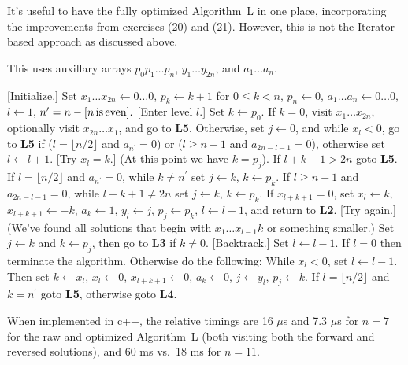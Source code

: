 
\noindent It's useful to have the fully optimized Algorithm~L in one place, 
incorporating the improvements from exercises (20) and (21).   However, this
is not the Iterator based approach as discussed above.

\noindent This uses auxillary arrays $p_0 p_1 \ldots p_n$, $y_1 \ldots y_{2n}$, 
and $a_1 \ldots a_n$.

 [Initialize.] Set $x_1 \ldots x_{2 n} \leftarrow 0 
\ldots 0$, $p_k \leftarrow k + 1$ for $0 \leq k < n$, $p_n \leftarrow 0$, 
$a_{1} \ldots a_{n} \leftarrow 0 \ldots 0$, $l \leftarrow 1$,
$n^{\prime} = n - [n \rm{\, is\, even}].$
\vskip 0.05in
 [Enter level $l$.] Set $k \gets p_0$.  If $k = 0$, visit
$x_1 \ldots x_{2n}$, optionally visit $x_{2n} \ldots x_1$, and 
go to {\bf L5}.  Otherwise, set $j \leftarrow 0$, and
while $x_l < 0$, go to {\bf L5} if ($l = \lfloor n / 2 \rfloor$ and 
$a_{n^{\prime}} = 0$) or ($l \ge n - 1$ and $a_{2n - l - 1} = 0$), otherwise
set $l \leftarrow l + 1$.
\vskip 0.05in
 [Try $x_l = k$.] (At this point we have $k = p_j$).  
If $l + k + 1 > 2n$ goto {\bf L5}.  If $l = \lfloor n / 2 \rfloor$ and 
$a_{n^{\prime}} = 0$, while $k \ne n^{\prime}$ set $j \leftarrow k$, 
$k \leftarrow p_k$.  If $l \ge n - 1$ and $a_{2n - l - 1} = 0$, while 
$l + k + 1 \ne 2 n $ set $j \leftarrow k$, $k \leftarrow p_k$.  If 
$x_{l + k + 1} = 0$, set $x_l \leftarrow k$, $x_{l + k + 1} \leftarrow - k$,
$a_k \leftarrow 1$, $y_l \leftarrow j$, $p_j \leftarrow p_k$, 
$l \leftarrow l + 1$, and return to {\bf L2}.
\vskip 0.05in
 [Try again.] (We've found all solutions that begin with 
$x_1 \ldots x_{l-1} k$ or something smaller.) Set $j \leftarrow k$ and 
$k \leftarrow p_j$, then go to {\bf L3} if $k \ne 0$.
\vskip 0.05in
 [Backtrack.] Set $l \leftarrow l - 1$.   If $l = 0$ then 
terminate the algorithm. Otherwise do the following: While $x_l < 0$, set 
$l \leftarrow l - 1$.  Then set $k \leftarrow x_l$, $x_l \leftarrow 0$, 
$x_{l + k + 1} \leftarrow 0$, $a_k \leftarrow 0$, $j \leftarrow y_l$, 
$p_j \leftarrow k$.  If $l = \lfloor n / 2 \rfloor$ and $k = n^{\prime}$
goto {\bf L5}, otherwise goto {\bf L4}.
\vskip 0.1in

\noindent When implemented in c++, the relative timings are 16 $\mu$s and 7.3 $\mu$s 
for $n = 7$ for the raw and optimized Algorithm~L (both visiting both the 
forward and reversed solutions), and 60 ms vs.\ 18 ms for $n = 11$.


